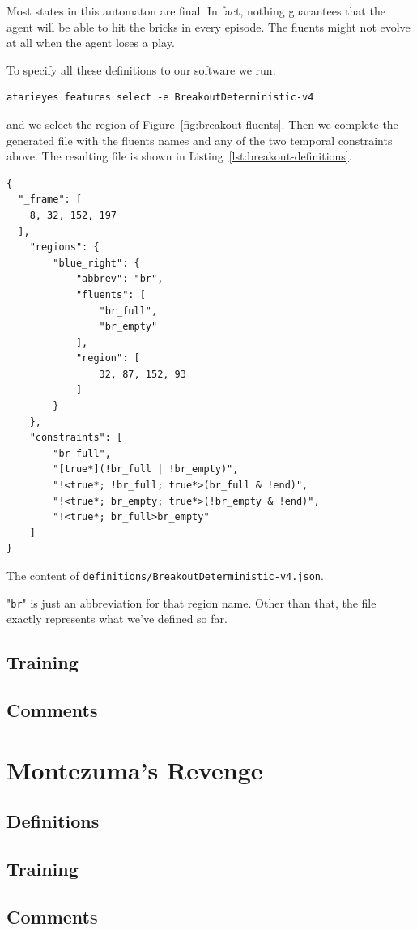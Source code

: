 Most states in this automaton are final. In fact, nothing guarantees that the
agent will be able to hit the bricks in every episode. The fluents might not
evolve at all when the agent loses a play.

To specify all these definitions to our software we run:
\begin{verbatim}
atarieyes features select -e BreakoutDeterministic-v4
\end{verbatim}
and we select the region of Figure~\ref{fig:breakout-fluents}. Then we
complete the generated file with the fluents names and any of the two temporal
constraints above. The resulting file is shown in
Listing~\ref{lst:breakout-definitions}. 
\begin{listing}
\begin{verbatim}
{
  "_frame": [
    8, 32, 152, 197
  ],
	"regions": {
		"blue_right": {
			"abbrev": "br",
			"fluents": [
				"br_full",
				"br_empty"
			],
			"region": [
				32, 87, 152, 93
			]
		}
	},
	"constraints": [
		"br_full",
		"[true*](!br_full | !br_empty)",
		"!<true*; !br_full; true*>(br_full & !end)",
		"!<true*; br_empty; true*>(!br_empty & !end)",
		"!<true*; br_full>br_empty"
	]
}
\end{verbatim}
\caption{The content of \texttt{definitions/BreakoutDeterministic-v4.json}.}
\label{lst:breakout-definitions}
\end{listing}
"\texttt{br}" is just an abbreviation for that region name. Other than that,
the file exactly represents what we've defined so far.


\subsection{Training}
\subsection{Comments}


\let\sectionbreak\savedsectionbreak

\section{Montezuma's Revenge}
\subsection{Definitions}
\subsection{Training}
\subsection{Comments}

